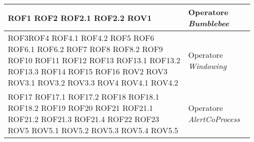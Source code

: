 {\begin{longtable}{L{5cm} L{8.5cm}}
ROF1 \newline ROF2 \newline ROF2.1 \newline ROF2.2 \newline ROV1 & Operatore \textit{Bumblebee} \\
\hline
ROF3\newline ROF4 \newline ROF4.1 \newline ROF4.2 \newline ROF5 \newline ROF6 \newline ROF6.1 \newline ROF6.2 \newline ROF7 \newline ROF8 \newline ROF8.2 \newline ROF9 \newline ROF10 \newline ROF11 \newline ROF12 \newline ROF13 \newline ROF13.1 \newline ROF13.2 \newline ROF13.3 \newline ROF14 \newline ROF15 \newline ROF16 \newline ROV2 \newline ROV3 \newline ROV3.1 \newline ROV3.2 \newline ROV3.3 \newline ROV4 \newline ROV4.1 \newline ROV4.2 & Operatore \textit{Windowing} \\
ROF17 \newline ROF17.1 \newline ROF17.2 \newline ROF18 \newline ROF18.1 \newline ROF18.2 \newline ROF19 \newline ROF20 \newline ROF21 \newline ROF21.1 \newline ROF21.2 \newline ROF21.3 \newline ROF21.4 \newline ROF22 \newline ROF23 \newline ROV5 \newline ROV5.1 \newline ROV5.2 \newline ROV5.3 \newline ROV5.4 \newline ROV5.5 & Operatore \textit{AlertCoProcess} \\
\hline
\end{longtable}
}
